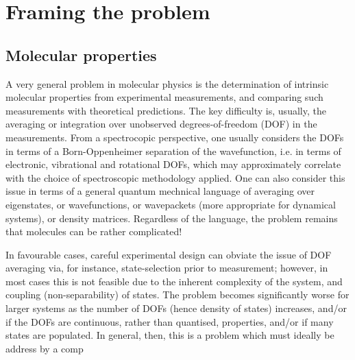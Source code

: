 \section{Framing the problem}

\subsection{Molecular properties}
A very general problem in molecular physics is the determination of intrinsic molecular properties from experimental measurements, and comparing such measurements with theoretical predictions. The key difficulty is, usually, the averaging or integration over unobserved degrees-of-freedom (DOF) in the measurements. From a spectrocopic perspective, one usually considers the DOFs in terms of a Born-Oppenheimer separation of the wavefunction, i.e. in terms of electronic, vibrational and rotational DOFs, which may approximately correlate with the choice of spectroscopic methodology applied. One can also consider this issue in terms of a general quantum mechnical language of averaging over eigenstates, or wavefunctions, or wavepackets (more appropriate for dynamical systems), or density matrices. Regardless of the language, the problem remains that molecules can be rather complicated!

In favourable cases, careful experimental design can obviate the issue of DOF averaging via, for instance, state-selection prior to measurement; however, in most cases this is not feasible due to the inherent complexity of the system, and coupling (non-separability) of states. The problem becomes significantly worse for larger systems as the number of DOFs (hence density of states) increases, and/or if the DOFs are continuous, rather than quantised, properties, and/or if many states are populated. In general, then, this is a problem which must ideally be address by a comp